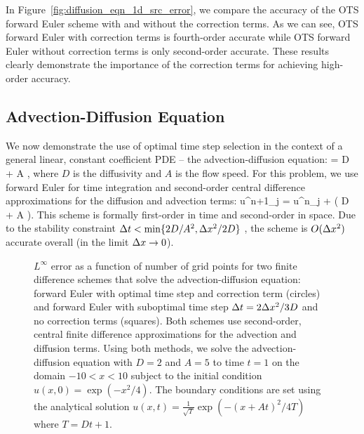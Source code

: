 \documentclass[oneeqnum,onefignum,onetabnum,onethmnum]{siamltex}
\begin{document}
In Figure~\ref{fig:diffusion_eqn_1d_src_error}, we compare the accuracy of 
the OTS forward Euler scheme with and without the correction terms.  As we can 
see, OTS forward Euler with correction terms is fourth-order accurate while 
OTS forward Euler without correction terms is only second-order accurate.  
These results clearly demonstrate the importance of the correction terms for
achieving high-order accuracy.


\subsection{Advection-Diffusion Equation}
We now demonstrate the use of optimal time step selection in the context of 
a general linear, constant coefficient PDE -- the advection-diffusion 
equation:
\beq
   = D  
  + A ,
  \label{eq:ADE_1d}
\eeq
where $D$ is the diffusivity and $A$ is the flow speed.  For this problem,
we use forward Euler for time integration and second-order central 
difference approximations for the diffusion and advection terms:
\beq
  u^{n+1}_j = u^{n}_j 
  + \dt 
    \left( D 
         + A  \right).
  \label{eq:ADE_1d_FD_scheme}
\eeq
This scheme is formally first-order in time and second-order in space.  
Due to the stability constraint $\Delta t < \min \{2D/A^2, \Delta x^2/2D \}$ 
\cite{chan_1984}, the scheme is $O(\Delta x^2)$ accurate overall (in the limit 
$\Delta x \rightarrow 0$).

\begin{figure}[tb]
\begin{center}
\caption{$L^\infty$ error as a function of number of grid points for 
two finite difference schemes that solve the advection-diffusion 
equation: forward Euler with optimal time step and correction term (circles) 
and forward Euler with suboptimal time step $\Delta t = 2\Delta x^2/3D$ and no correction 
terms (squares).  Both schemes use second-order, central finite difference 
approximations for the advection and diffusion terms.
Using both methods, we solve the advection-diffusion equation with $D = 2$
and $A = 5$ to time $t = 1$ on the domain $-10 < x < 10$ subject to the 
initial condition $u(x,0) = \exp(-x^2/4)$.  The boundary conditions are set 
using the analytical solution 
$u(x,t) = \frac{1}{\sqrt{T}} \exp \left( -(x+At)^2/4T \right)$
where $T = Dt+1$.
}
\label{fig:ADE_1d_error}
\end{center}
\end{figure}
\end{document}
